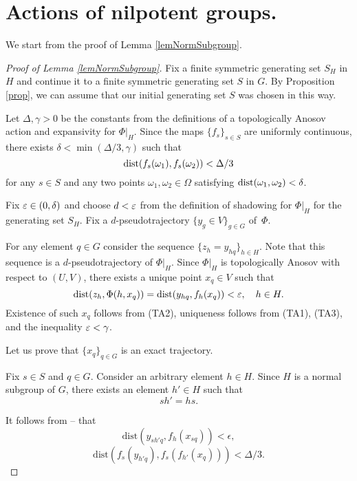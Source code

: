 \section{Actions of nilpotent groups.}
We start from the proof of Lemma \ref{lemNormSubgroup}.

\begin{proof}[Proof of Lemma \ref{lemNormSubgroup}]

Fix a finite symmetric generating set $S_H$ in $H$ and continue it to a finite symmetric generating set $S$ in $G$. By Proposition \ref{prop}, we can assume that our initial generating set $S$ was chosen in this way.

Let $\Delta, \gamma > 0$ be the constants from the definitions of a topologically Anosov action and expansivity for $\Phi|_H$.
Since the maps $\{f_s\}_{s \in S}$ are uniformly continuous, there exists $\delta < \min(\Delta/3, \gamma)$ such that
\begin{equation}\label{eqUnCont}
\operatorname{dist}(f_s(\omega_1), f_s(\omega_2)) < \Delta/3
\end{equation}
for any $s \in S$ and any two points $\omega_1, \omega_2 \in \Omega$ satisfying $\operatorname{dist}(\omega_1, \omega_2) < \delta$.

Fix $\varepsilon \in (0, \delta)$ and choose $d < \varepsilon$ from the definition of shadowing for $\Phi|_H$ for the generating set $S_H$. Fix a $d$-pseudotrajectory $\{y_g \in V\}_{g\in G}$ of~$\Phi$.

For any element $q\in G$ consider the sequence $\{z_h = y_{hq}\}_{h\in H}$. Note that this sequence is a $d$-pseudotrajectory of $\Phi|_{H}$. Since $\Phi|_{H}$ is topologically Anosov with respect to $(U, V)$, there exists a unique point $x_q\in V$ such that
\begin{equation}
\label{shad1}
\operatorname{dist}(z_h,\Phi(h,x_q))=\operatorname{dist}(y_{hq},f_{h}(x_q)) < \varepsilon, \quad h \in H.
\end{equation}
Existence of such $x_q$ follows from (TA2), uniqueness follows from (TA1), (TA3), and the inequality $\varepsilon < \gamma$.

Let us prove that $\{x_q\}_{q\in G}$ is an exact trajectory.

Fix $s \in S$ and $q \in G$. Consider an arbitrary element $h\in H$. Since $H$ is a normal subgroup of $G$, there exists an element $h'\in H$ such that
\begin{equation}
\label{connect}
sh'=hs.
\end{equation}

It follows from -- that
\begin{equation}
\label{ineq1}
\mbox{dist}(y_{sh'q},f_{h}(x_{sq})) < \epsilon,
\end{equation}
\begin{equation}
\label{shad2}
\mbox{dist}(f_s(y_{h'q}),f_s(f_{h'}(x_q))) < \Delta/3.
\end{equation}


\end{proof}

